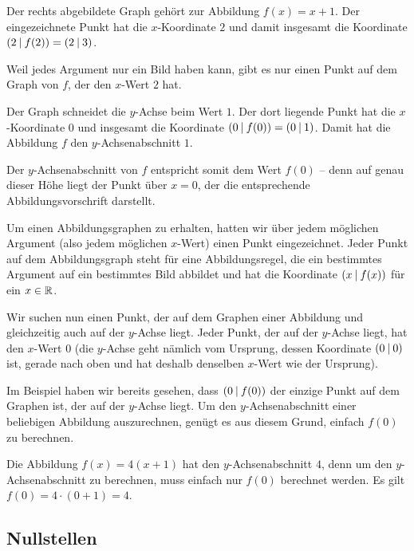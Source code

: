 \documentclass[../../main.tex]{subfiles}
\begin{document}
\begin{example}{}
    \parpic[r]{
    }
    Der rechts abgebildete Graph gehört zur Abbildung \mbox{$f(x)=x+1$}. Der eingezeichnete Punkt hat die $x$-Koordinate $2$ und damit insgesamt die Koordinate $\left(2 \:\middle|\: f(2)\right)=\left(2 \:\middle|\: 3\right)$. 
    
    Weil jedes Argument nur ein Bild haben kann, gibt es nur einen Punkt auf dem Graph von $f$, der den $x$-Wert $2$ hat.
    
    Der Graph schneidet die $y$-Achse beim Wert $1$. Der dort liegende Punkt hat die $x$-Koordinate $0$ und insgesamt die Koordinate $\left(0 \:\middle|\: f(0)\right)=\left(0 \:\middle|\: 1\right)$. Damit hat die Abbildung $f$ den $y$-Achsenabschnitt $1$.
    
    Der $y$-Achsenabschnitt von $f$ entspricht somit dem Wert $f(0)$ -- denn auf genau dieser Höhe liegt der Punkt über $x=0$, der die entsprechende Abbildungsvorschrift darstellt.
\end{example}

Um einen Abbildungsgraphen zu erhalten, hatten wir über jedem möglichen Argument (also jedem möglichen $x$-Wert) einen Punkt eingezeichnet. Jeder Punkt auf dem Abbildungsgraph steht für eine Abbildungsregel, die ein bestimmtes Argument auf ein bestimmtes Bild abbildet und hat die Koordinate $\left(x \:\middle|\: f(x)\right)$ für ein $x\in\mathbb{R}$.

Wir suchen nun einen Punkt, der auf dem Graphen einer Abbildung und gleichzeitig auch auf der $y$-Achse liegt. Jeder Punkt, der auf der $y$-Achse liegt, hat den $x$-Wert $0$ (die $y$-Achse geht nämlich vom Ursprung, dessen Koordinate $\left(0 \:\middle|\: 0\right)$ ist, gerade nach oben und hat deshalb denselben $x$-Wert wie der Ursprung). 

Im Beispiel haben wir bereits gesehen, dass $\left(0 \:\middle|\: f(0)\right)$ der einzige Punkt auf dem Graphen ist, der auf der $y$-Achse liegt. Um den $y$-Achsenabschnitt einer beliebigen Abbildung auszurechnen, genügt es aus diesem Grund, einfach $f(0)$ zu berechnen.

\begin{example}{}
    \sloppy
    Die Abbildung $f(x)=4(x+1)$ hat den $y$-Achsenabschnitt $4$, denn um den $y$-Achsenabschnitt zu berechnen, muss einfach nur $f(0)$ berechnet werden. Es gilt $f(0)=4\cdot (0+1)=4$.
\end{example}

\fussy

\subsection{Nullstellen}
\label{sec:abbildungen_nullstelle}
\end{document}
